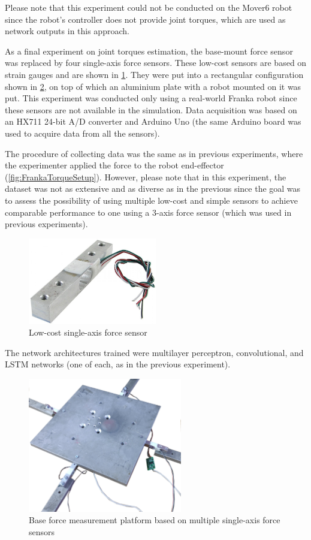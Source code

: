 Please note that this experiment could not be conducted on the Mover6 robot since the robot's controller does not provide joint torques, which are used as network outputs in this approach.

As a final experiment on joint torques estimation, the base-mount force sensor was replaced by four single-axis force sensors. These low-cost sensors are based on strain gauges and are shown in \cref{fig:StrainGauge}. They were put into a rectangular configuration shown in \cref{fig:Platform}, on top of which an aluminium plate with a robot mounted on it was put. This experiment was conducted only using a real-world Franka robot since these sensors are not available in the simulation. Data acquisition was based on an HX711 24-bit A/D converter and Arduino Uno (the same Arduino board was used to acquire data from all the sensors).

The procedure of collecting data was the same as in previous experiments, where the experimenter applied the force to the robot end-effector (\cref{fig:FrankaTorqueSetup}). However, please note that in this experiment, the dataset was not as extensive and as diverse as in the previous since the goal was to assess the possibility of using multiple low-cost and simple sensors to achieve comparable performance to one using a 3-axis force sensor (which was used in previous experiments).

\begin{figure}
    \centering
    \includegraphics[width=0.5\textwidth]{slike/Load-Cell.png}
    \caption{Low-cost single-axis force sensor}
    \label{fig:StrainGauge}
\end{figure}

The network architectures trained were multilayer perceptron, convolutional, and LSTM networks (one of each, as in the previous experiment).

\begin{figure}
    \centering
    \includegraphics[width=0.6\textwidth]{slike/platform.png}
    \caption{Base force measurement platform based on multiple single-axis force sensors}
    \label{fig:Platform}
\end{figure}

\newpage